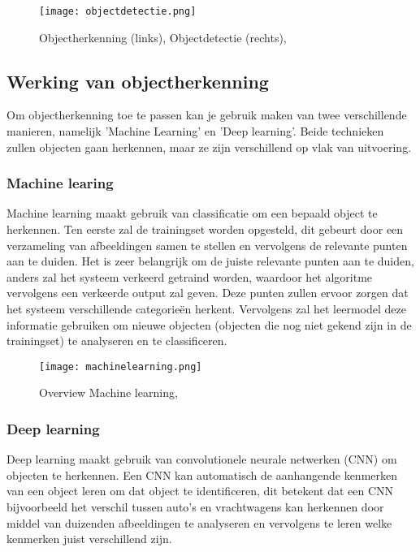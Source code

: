 \begin{figure}[H]
	\centering
	\texttt{[image: objectdetectie.png]}
	\caption{Objectherkenning (links), Objectdetectie (rechts), \autocite{ObjRec2020}}
\end{figure}

\subsection{Werking van objectherkenning}
Om objectherkenning toe te passen kan je gebruik maken van twee verschillende manieren, namelijk 'Machine Learning' en 'Deep learning'. Beide technieken zullen objecten gaan herkennen, maar ze zijn verschillend op vlak van uitvoering.

\subsubsection{Machine learing}
Machine learning maakt gebruik van classificatie om een bepaald object te herkennen. Ten eerste zal de trainingset worden opgesteld, dit gebeurt door een verzameling van afbeeldingen samen te stellen en vervolgens de relevante punten aan te duiden. Het is zeer belangrijk om de juiste relevante punten aan te duiden, anders zal het systeem verkeerd getraind worden, waardoor het algoritme vervolgens een verkeerde output zal geven. Deze punten zullen ervoor zorgen dat het systeem verschillende categorieën herkent. Vervolgens zal het leermodel deze informatie gebruiken om nieuwe objecten (objecten die nog niet gekend zijn in de trainingset) te analyseren en te classificeren. \autocite{ObjRec2020}


\begin{figure}[H]
	\centering
	\texttt{[image: machinelearning.png]}
	\caption{Overview Machine learning, \autocite{ObjRec2020}}
\end{figure}


\subsubsection{Deep learning}
Deep learning maakt gebruik van convolutionele neurale netwerken (CNN) om objecten te herkennen. Een CNN kan automatisch de aanhangende kenmerken van een object leren om dat object te identificeren, dit betekent dat een CNN bijvoorbeeld het verschil tussen auto's en vrachtwagens kan herkennen door middel van duizenden afbeeldingen te analyseren en vervolgens te leren welke kenmerken juist verschillend zijn. \autocite{ObjRec2020}

